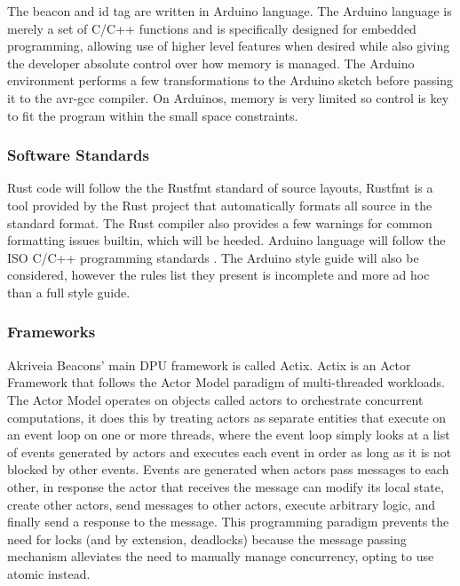 \bigskip
The beacon and id tag are written in Arduino language. The Arduino language is merely a set of C/C++ functions and is specifically designed for embedded programming, allowing use of higher level features when desired while also giving the developer absolute control over how memory is managed. The Arduino environment performs a few transformations to the Arduino sketch before passing it to the avr-gcc compiler. On Arduinos, memory is very limited so control is key to fit the program within the small space constraints.


\medskip
\subsubsection{Software Standards}
\medskip
Rust code will follow the the Rustfmt standard of source layouts, Rustfmt is a tool provided by the Rust project that automatically formats all source in the standard format. The Rust compiler also provides a few warnings for common formatting issues builtin, which will be heeded. Arduino language will follow the ISO C/C++ programming standards \cite{cpp_core_guidelines}. The Arduino style guide \cite{arduino_style_guide} will also be considered, however the rules list they present is incomplete and more ad hoc than a full style guide.

\medskip
\subsubsection{Frameworks}
\medskip
Akriveia Beacons' main DPU framework is called \Gls{Actix}. Actix is an \Gls{Actor} Framework that follows the \Gls{Actor Model} paradigm of multi-threaded workloads. The Actor Model operates on objects called actors to orchestrate concurrent computations, it does this by treating actors as separate entities that execute on an event loop on one or more threads, where the event loop simply looks at a list of events generated by actors and executes each event in order as long as it is not blocked by other events.
Events are generated when actors pass messages to each other, in response the actor that receives the message can modify its local state, create other actors, send messages to other actors, execute arbitrary logic, and finally send a response to the message. This programming paradigm prevents the need for locks (and by extension, deadlocks) because the message passing mechanism alleviates the need to manually manage concurrency, opting to use atomic instead.

